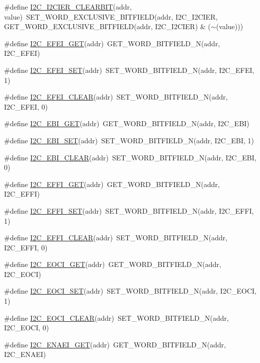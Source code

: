 \begin{DoxyCompactItemize}
\item 
\#define \hyperlink{a00557_a3cda761dfd54278a935592f6e37d6ef6}{I2C\_\-I2CIER\_\-CLEARBIT}(addr, value)~SET\_\-WORD\_\-EXCLUSIVE\_\-BITFIELD(addr, I2C\_\-I2CIER, GET\_\-WORD\_\-EXCLUSIVE\_\-BITFIELD(addr, I2C\_\-I2CIER) \& ($\sim$(value)))
\item 
\#define \hyperlink{a00557_a30ed062be285789e5e9acfbf701c1f52}{I2C\_\-EFEI\_\-GET}(addr)~GET\_\-WORD\_\-BITFIELD\_\-N(addr, I2C\_\-EFEI)
\item 
\#define \hyperlink{a00557_a5f5b7430895f653f33813cad3eb74486}{I2C\_\-EFEI\_\-SET}(addr)~SET\_\-WORD\_\-BITFIELD\_\-N(addr, I2C\_\-EFEI, 1)
\item 
\#define \hyperlink{a00557_ac7b88246cb8076cc9d40cc36ada7a97e}{I2C\_\-EFEI\_\-CLEAR}(addr)~SET\_\-WORD\_\-BITFIELD\_\-N(addr, I2C\_\-EFEI, 0)
\item 
\#define \hyperlink{a00557_aea95c0e54fc6ed4081c9b201a7ec6d5c}{I2C\_\-EBI\_\-GET}(addr)~GET\_\-WORD\_\-BITFIELD\_\-N(addr, I2C\_\-EBI)
\item 
\#define \hyperlink{a00557_a78c5899dc7d924f91cae19f26a102217}{I2C\_\-EBI\_\-SET}(addr)~SET\_\-WORD\_\-BITFIELD\_\-N(addr, I2C\_\-EBI, 1)
\item 
\#define \hyperlink{a00557_a3ea13f736c32406dd17ec49b8de56cae}{I2C\_\-EBI\_\-CLEAR}(addr)~SET\_\-WORD\_\-BITFIELD\_\-N(addr, I2C\_\-EBI, 0)
\item 
\#define \hyperlink{a00557_ad00d47f511a206ff2b3dc82d990c5402}{I2C\_\-EFFI\_\-GET}(addr)~GET\_\-WORD\_\-BITFIELD\_\-N(addr, I2C\_\-EFFI)
\item 
\#define \hyperlink{a00557_af1d96c7cdccf4aec409ac59ea796dcce}{I2C\_\-EFFI\_\-SET}(addr)~SET\_\-WORD\_\-BITFIELD\_\-N(addr, I2C\_\-EFFI, 1)
\item 
\#define \hyperlink{a00557_aea13878544893de80735e8d6526eebef}{I2C\_\-EFFI\_\-CLEAR}(addr)~SET\_\-WORD\_\-BITFIELD\_\-N(addr, I2C\_\-EFFI, 0)
\item 
\#define \hyperlink{a00557_a154c3bebeb34f12a73b3f1257832023c}{I2C\_\-EOCI\_\-GET}(addr)~GET\_\-WORD\_\-BITFIELD\_\-N(addr, I2C\_\-EOCI)
\item 
\#define \hyperlink{a00557_a80a73be7417385b58a0c43d5c181389a}{I2C\_\-EOCI\_\-SET}(addr)~SET\_\-WORD\_\-BITFIELD\_\-N(addr, I2C\_\-EOCI, 1)
\item 
\#define \hyperlink{a00557_a337089d0348581359ef90040d012b580}{I2C\_\-EOCI\_\-CLEAR}(addr)~SET\_\-WORD\_\-BITFIELD\_\-N(addr, I2C\_\-EOCI, 0)
\item 
\#define \hyperlink{a00557_a45ef4166156ddcb6a1c57ba7215b50da}{I2C\_\-ENAEI\_\-GET}(addr)~GET\_\-WORD\_\-BITFIELD\_\-N(addr, I2C\_\-ENAEI)

\end{DoxyCompactItemize}

